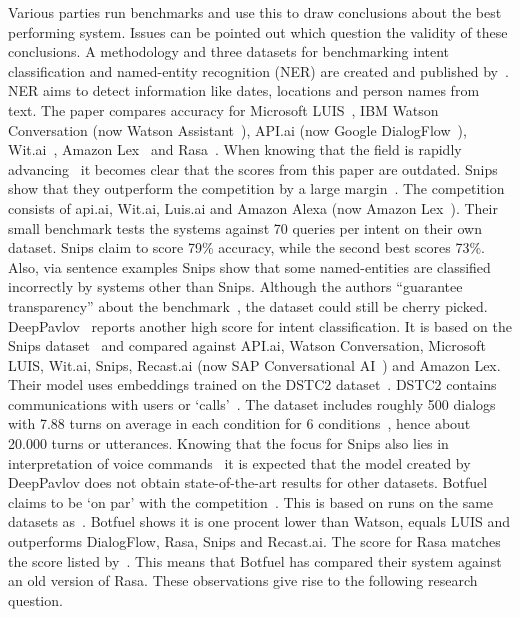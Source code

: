 Various parties run benchmarks and use this to draw conclusions about the best performing system.
Issues can be pointed out which question the validity of these conclusions.
A methodology and three datasets for benchmarking intent classification and named-entity recognition (NER) are created and published by~\citet{braun2017}.
NER aims to detect information like dates, locations and person names from text.
The paper compares accuracy for Microsoft LUIS~\citep{microsoft2019luis}, IBM Watson Conversation (now Watson Assistant~\citep{ibm2019assistant}), API.ai (now Google DialogFlow~\citep{google2019dialogflow}), Wit.ai~\citep{facebook2019wit}, Amazon Lex~\citep{amazon2019lex} and Rasa~\citep{bocklisch2017rasa}.
When knowing that the field is rapidly advancing~\citep{young2018recent} it becomes clear that the scores from this paper are outdated.
Snips~\citep{snips2019voice} show that they outperform the competition by a large margin~\citep{snips2017benchmarking}.
The competition consists of api.ai, Wit.ai, Luis.ai and Amazon Alexa (now Amazon Lex~\citep{amazon2019lex}).
Their small benchmark tests the systems against 70 queries per intent on their own dataset.
Snips claim to score 79\% accuracy, while the second best scores 73\%.
Also, via sentence examples Snips show that some named-entities are classified incorrectly by systems other than Snips.
Although the authors ``guarantee transparency'' about the benchmark~\citep{snips2017dataset}, the dataset could still be cherry picked.
DeepPavlov~\citep{burtsev2018} reports another high score for intent classification.
It is based on the Snips dataset~\citep{snips2017dataset} and compared against API.ai, Watson Conversation, Microsoft LUIS, Wit.ai, Snips, Recast.ai (now SAP Conversational AI~\citep{sap2019conversational}) and Amazon Lex.
Their model uses embeddings trained on the DSTC2 dataset~\citep{baymurzina2019classifiers,baymurzina2019intents}.
DSTC2 contains communications with users or `calls'~\citep{henderson2014second}.
The dataset includes roughly 500 dialogs with 7.88 turns on average in each condition for 6 conditions~\citep{henderson2014second}, hence about 20.000 turns or utterances.
Knowing that the focus for Snips also lies in interpretation of voice commands~\citep{snips2019voice} it is expected that the model created by DeepPavlov does not obtain state-of-the-art results for other datasets.
Botfuel~\citep{botfuel2019} claims to be `on par' with the competition~\citep{botfuel2018benchmark}.
This is based on runs on the same datasets as~\citet{braun2017}.
Botfuel shows it is one procent lower than Watson, equals LUIS and outperforms DialogFlow, Rasa, Snips and Recast.ai.
The score for Rasa matches the score listed by~\citet{braun2017}.
This means that Botfuel has compared their system against an old version of Rasa.
These observations give rise to the following research question.\\

